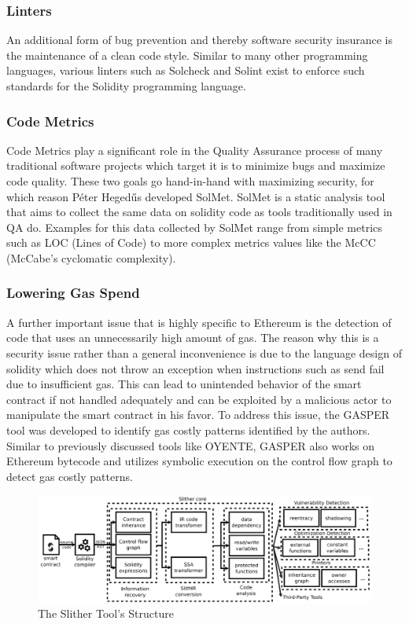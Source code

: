 \documentclass[letterpaper,twocolumn,10pt]{article}
\begin{document}
\subsubsection{Linters}
An additional form of bug prevention and thereby software security insurance is the maintenance of a clean code style. Similar to many other programming languages, various linters such as Solcheck and Solint exist to enforce such standards for the Solidity programming language.

\subsubsection{Code Metrics}
Code Metrics play a significant role in the Quality Assurance process of many traditional software projects which target it is to minimize bugs and maximize code quality. These two goals go hand-in-hand with maximizing security, for which reason Péter Hegedűs developed SolMet. SolMet is a static analysis tool that aims to collect the same data on solidity code as tools traditionally used in QA do. Examples for this data collected by SolMet range from simple metrics such as LOC (Lines of Code) to more complex metrics values like the McCC (McCabe’s cyclomatic complexity).


\subsubsection{Lowering Gas Spend}
A further important issue that is highly specific to Ethereum is the detection of code that uses an unnecessarily high amount of gas. The reason why this is a security issue rather than a general inconvenience is due to the language design of solidity which does not throw an exception when instructions such as send fail due to insufficient gas. This can lead to unintended behavior of the smart contract if not handled adequately and can be exploited by a malicious actor to manipulate the smart contract in his favor. To address this issue, the GASPER tool was developed to identify gas costly patterns identified by the authors. Similar to previously discussed tools like OYENTE, GASPER also works on Ethereum bytecode and utilizes symbolic execution on the control flow graph to detect gas costly patterns.


\begin{figure}
\begin{center}
\includegraphics[scale=0.15]{Slither}
\end{center}
\caption{\label{fig:oyente} The Slither Tool's Structure}
\end{figure}
\end{document}
